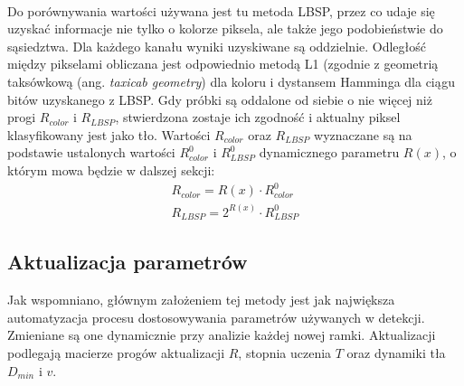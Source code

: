 \paragraph{}
Do porównywania wartości używana jest tu metoda LBSP, przez co udaje się uzyskać informacje nie tylko o kolorze piksela, ale także jego podobieństwie do sąsiedztwa. Dla każdego kanału wyniki uzyskiwane są oddzielnie. Odległość między pikselami obliczana jest odpowiednio metodą L1 (zgodnie z geometrią taksówkową (ang. \textit{taxicab geometry}) dla koloru i dystansem Hamminga dla ciągu bitów uzyskanego z LBSP. Gdy próbki są oddalone od siebie o nie więcej niż progi $R_{color}$ i $R_{LBSP}$, stwierdzona zostaje ich zgodność i aktualny piksel klasyfikowany jest jako tło. Wartości $R_{color}$ oraz $R_{LBSP}$ wyznaczane są na podstawie ustalonych wartości $R_{color}^{0}$ i $R_{LBSP}^{0}$ dynamicznego parametru $R(x)$, o którym mowa będzie w dalszej sekcji:
\begin{gather}
R_{color} = R(x)\cdot R_{color}^{0} \\
R_{LBSP} = 2^{R(x)}\cdot R_{LBSP}^{0}
\end{gather}
\subsection{Aktualizacja parametrów}
Jak wspomniano, głównym założeniem tej metody jest jak największa automatyzacja procesu dostosowywania parametrów używanych w detekcji. Zmieniane są one dynamicznie przy analizie każdej nowej ramki. Aktualizacji podlegają macierze progów aktualizacji $R$, stopnia uczenia $T$ oraz dynamiki tła $D_{min}$ i $v$.
